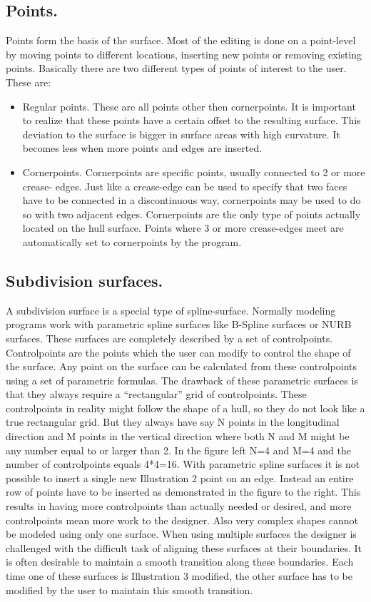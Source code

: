 \documentclass[12pt]{article}
\begin{document}
\subsection{Points.}
Points form the basis of the surface. Most of the editing is done on a point-level by moving points to
different locations, inserting new points or removing existing points. Basically there are two different
types of points of interest to the user. These are:

\begin{itemize}
  \item Regular points. These are all points other then cornerpoints. It is important to realize that
these points have a certain offset to the resulting surface. This deviation to the surface is
bigger in surface areas with high curvature. It becomes less when more points and edges
are inserted.
  \item Cornerpoints. Cornerpoints are specific points, usually connected to 2 or more crease-
edges. Just like a crease-edge can be used to specify that two faces have to be connected
in a discontinuous way, cornerpoints may be used to do so with two adjacent edges.
Cornerpoints are the only type of points actually located on the hull surface. Points where 3
or more crease-edges meet are automatically set to cornerpoints by the program.
\end{itemize}

\subsection{Subdivision surfaces.}
A subdivision surface is a special type of spline-surface. Normally modeling programs work with
parametric spline surfaces like B-Spline surfaces or NURB surfaces. These surfaces are completely
described by a set of controlpoints. Controlpoints are the points which the user can modify to control
the shape of the surface. Any point on the surface can be
calculated from these controlpoints using a set of parametric
formulas. The drawback of these parametric surfaces is that they
always require a “rectangular” grid of controlpoints. These
controlpoints in reality might follow the shape of a hull, so they do
not look like a true rectangular grid. But they always have say N
points in the longitudinal direction and M points in the vertical
direction where both N and M might be any number equal to or
larger than 2. In the figure left N=4 and M=4 and the number of
controlpoints equals 4*4=16. With parametric spline surfaces it is
not possible to insert a single new
Illustration 2
point on an edge. Instead an entire
row of points have to be inserted as demonstrated in the figure to
the right. This results in having more controlpoints than actually
needed or desired, and more controlpoints mean more work to the
designer. Also very complex shapes cannot be modeled using only
one surface. When using multiple surfaces the designer is
challenged with the difficult task of aligning these surfaces at their
boundaries. It is often desirable to maintain a smooth transition
along these boundaries. Each time one of these surfaces is
 Illustration 3
modified, the other surface has to be modified by the user to
maintain this smooth transition.
\end{document}
